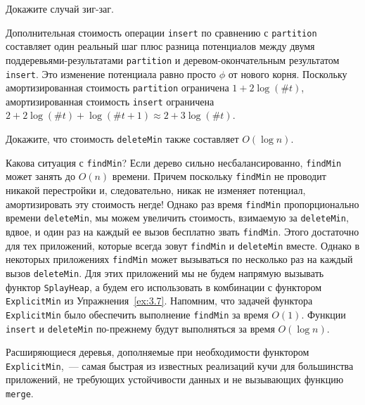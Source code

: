 \begin{theorem}
\begin{exercise}\label{ex:5.5}
  Докажите случай зиг-заг.
\end{exercise}

Дополнительная стоимость операции \lstinline!insert! по сравнению с
\lstinline!partition! составляет один реальный шаг плюс разница
потенциалов между двумя поддеревьями-результатами
\lstinline!partition! и деревом-окончательным результатом
\lstinline!insert!. Это изменение потенциала равно просто $\phi$ от
нового корня. Поскольку амортизированная стоимость
\lstinline!partition! ограничена $1 + 2\log(\#t)$, амортизированная
стоимость \lstinline!insert! ограничена
$2 + 2\log(\#t) + \log(\#t + 1) \approx 2 + 3\log(\#t)$.

\end{theorem}

\begin{exercise}\label{ex:5.6}
  Докажите, что стоимость \lstinline!deleteMin! также составляет
  $O(\log n)$.
\end{exercise}

Какова ситуация с \lstinline!findMin!? Если дерево сильно
несбалансированно, \lstinline!findMin! может занять до $O(n)$
времени. Причем поскольку \lstinline!findMin! не проводит никакой
перестройки и, следовательно, никак не изменяет потенциал,
амортизировать эту стоимость негде! Однако раз время
\lstinline!findMin! пропорционально времени \lstinline!deleteMin!,
мы можем увеличить стоимость, взимаемую за \lstinline!deleteMin!,
вдвое, и один раз на каждый ее вызов бесплатно звать
\lstinline!findMin!. Этого достаточно для тех приложений, которые
всегда зовут \lstinline!findMin! и \lstinline!deleteMin!
вместе. Однако в некоторых приложениях \lstinline!findMin! может
вызываться по несколько раз на каждый вызов \lstinline!deleteMin!. Для
этих приложений мы не будем напрямую вызывать функтор
\lstinline!SplayHeap!, а будем его использовать в комбинации с
функтором \lstinline!ExplicitMin! из
Упражнения~\ref{ex:3.7}. Напомним, что задачей функтора
\lstinline!ExplicitMin! было обеспечить выполнение \lstinline!findMin!
за время $O(1)$. Функции \lstinline!insert! и \lstinline!deleteMin!
по-прежнему будут выполняться за время $O(\log n)$.

\begin{hint}
  Расширяющиеся деревья, дополняемые при необходимости функтором
  \lstinline!ExplicitMin!,~--- самая быстрая из известных реализаций
  кучи для большинства приложений, не требующих устойчивости данных и
  не вызывающих функцию \lstinline!merge!.
\end{hint}

